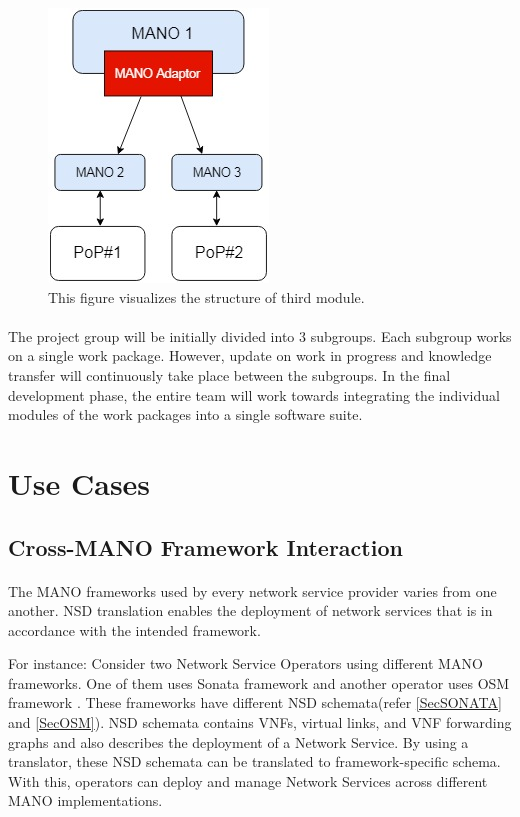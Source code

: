 \begin{figure}[h]
	\centering
	\includegraphics[width=0.3\linewidth]{figures/Structure2}
	\caption{This figure visualizes the structure of third module. }
	\label{fig:structure2}
\end{figure}

\paragraph{}
The project group will be initially divided into 3 subgroups. Each subgroup works on a single work package. However, update on work in progress and knowledge transfer will continuously take place between the subgroups. In the final development phase, the entire team will work towards integrating the individual modules of the work packages into a single software suite.

\newpage
\section{Use Cases}

\subsection{Cross-MANO Framework Interaction}
\paragraph{}

The MANO frameworks used by every network service provider varies from one another. NSD translation enables the deployment of network services that is in accordance with the intended framework.

For instance: Consider two Network Service Operators using different MANO frameworks. One of them uses Sonata framework \cite{draxler2017sonata} and another operator uses OSM framework \cite{ersue2013etsi}. These frameworks have different NSD schemata(refer \ref{SecSONATA} and \ref{SecOSM}). NSD schemata contains VNFs, virtual links, and VNF forwarding graphs and also describes the deployment of a Network Service. By using a translator, these NSD schemata can be translated to framework-specific schema. With this, operators can deploy and manage Network Services across different MANO implementations.

